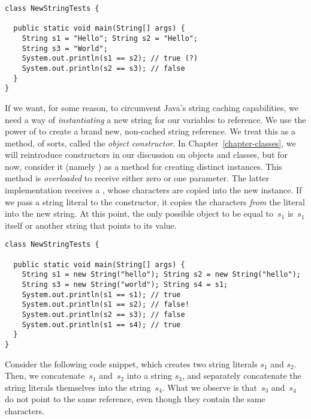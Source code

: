 \begin{lstlisting}[language=MyJava]
class NewStringTests {

  public static void main(String[] args) {
    String s1 = "Hello"; String s2 = "Hello";
    String s3 = "World";
    System.out.println(s1 == s2); // true (?)
    System.out.println(s2 == s3); // false
  }
}
\end{lstlisting}

If we want, for some reason, to circumvent Java's string caching capabilities, we need a way of \emph{instantiating} a new string for our variables to reference. 
We use the power of  to create a brand new, non-cached string reference. 
We treat this as a method, of sorts, called the \emph{object constructor}. 
In Chapter~\ref{chapter-classes}, we will reintroduce constructors in our discussion on objects and classes, but for now, consider it (namely ) as a method for creating distinct  instances. 
This method is \emph{overloaded} to receive either zero or one parameter. 
The latter implementation receives a , whose characters are copied into the new  instance. 
If we pass a string literal to the constructor, it copies the characters \emph{from} the literal into the new string. 
At this point, the only possible object to be equal to~$s_1$ is~$s_1$ itself or another string that points to its value.

\begin{lstlisting}[language=MyJava]
class NewStringTests {

  public static void main(String[] args) {
    String s1 = new String("hello"); String s2 = new String("hello");
    String s3 = new String("world"); String s4 = s1;
    System.out.println(s1 == s1); // true
    System.out.println(s1 == s2); // false!
    System.out.println(s2 == s3); // false
    System.out.println(s1 == s4); // true
  }
}
\end{lstlisting}

Consider the following code snippet, which creates two string literals $s_1$ and $s_2$. Then, we concatenate~$s_1$ and~$s_2$ into a string $s_3$, and separately concatenate the string literals themselves into the string~$s_4$. 
What we observe is that~$s_3$ and~$s_4$ do not point to the same reference, even though they contain the same characters.

